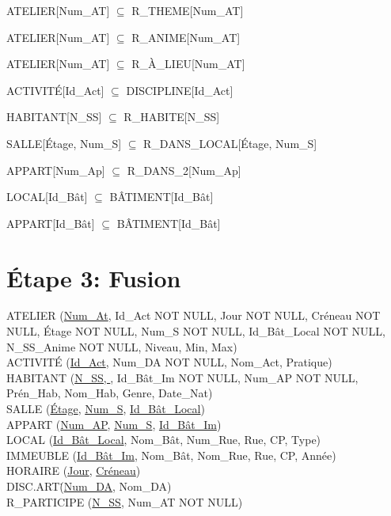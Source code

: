 \documentclass[a4paper,10.5pt]{report}
\begin{document}
	ATELIER[Num\_AT] $\subseteq$ R\_THEME[Num\_AT]

	ATELIER[Num\_AT] $\subseteq$ R\_ANIME[Num\_AT]

	ATELIER[Num\_AT] $\subseteq$ R\_À\_LIEU[Num\_AT]

	ACTIVITÉ[Id\_Act] $\subseteq$ DISCIPLINE[Id\_Act]

	HABITANT[N\_SS] $\subseteq$ R\_HABITE[N\_SS]

	SALLE[Étage, Num\_S] $\subseteq$ R\_DANS\_LOCAL[Étage, Num\_S]

	APPART[Num\_Ap] $\subseteq$ R\_DANS\_2[Num\_Ap]

	LOCAL[Id\_Bât] $\subseteq$ BÂTIMENT[Id\_Bât]

	APPART[Id\_Bât] $\subseteq$ BÂTIMENT[Id\_Bât]

    \section*{Étape 3: Fusion}

	ATELIER (\underline{Num\_At}, Id\_Act NOT NULL, Jour NOT NULL, Créneau NOT NULL, Étage NOT NULL, Num\_S NOT NULL, Id\_Bât\_Local NOT NULL, N\_SS\_Anime NOT NULL, Niveau, Min, Max) \\

	ACTIVITÉ (\underline{Id\_Act}, Num\_DA NOT NULL, Nom\_Act, Pratique) \\

	HABITANT (\underline{N\_SS, }, Id\_Bât\_Im NOT NULL, Num\_AP NOT NULL, Prén\_Hab, Nom\_Hab, Genre, Date\_Nat)  \\

	SALLE (\underline{Étage}, \underline{Num\_S}, \underline{Id\_Bât\_Local}) \\

	APPART (\underline{Num\_AP}, \underline{Num\_S}, \underline{Id\_Bât\_Im}) \\

	LOCAL (\underline{Id\_Bât\_Local}, Nom\_Bât, Num\_Rue, Rue, CP, Type) \\

	IMMEUBLE (\underline{Id\_Bât\_Im}, Nom\_Bât, Nom\_Rue, Rue, CP, Année) \\

	HORAIRE (\underline{Jour}, \underline{Créneau}) \\

	DISC.ART\. (\underline{Num\_DA}, Nom\_DA) \\

	R\_PARTICIPE (\underline{N\_SS}, Num\_AT NOT NULL) \\
\end{document}
